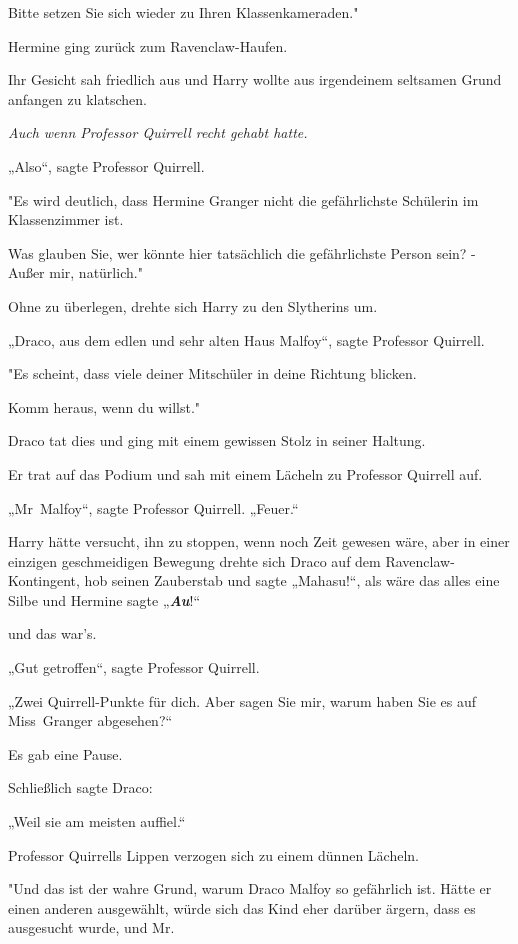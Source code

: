 {Bitte setzen Sie sich wieder zu Ihren Klassenkameraden."

Hermine ging zurück zum Ravenclaw-Haufen.

Ihr Gesicht sah friedlich aus und Harry wollte aus irgendeinem seltsamen Grund anfangen zu klatschen.

\emph{Auch wenn Professor Quirrell recht gehabt hatte.}

„Also“, sagte Professor Quirrell.

"Es wird deutlich, dass Hermine Granger nicht die gefährlichste Schülerin im Klassenzimmer ist.

Was glauben Sie, wer könnte hier tatsächlich die gefährlichste Person sein? - Außer mir, natürlich."

Ohne zu überlegen, drehte sich Harry zu den Slytherins um.

„Draco, aus dem edlen und sehr alten Haus Malfoy“, sagte Professor Quirrell.

"Es scheint, dass viele deiner Mitschüler in deine Richtung blicken.

Komm heraus, wenn du willst."

Draco tat dies und ging mit einem gewissen Stolz in seiner Haltung.

Er trat auf das Podium und sah mit einem Lächeln zu Professor Quirrell auf.

„Mr~Malfoy“, sagte Professor Quirrell. „Feuer.“

Harry hätte versucht, ihn zu stoppen, wenn noch Zeit gewesen wäre, aber in einer einzigen geschmeidigen Bewegung drehte sich Draco auf dem Ravenclaw-Kontingent, hob seinen Zauberstab und sagte „Mahasu!“, als wäre das alles eine Silbe und Hermine sagte „\textbf{\emph{Au}}!“

und das war's.

„Gut getroffen“, sagte Professor Quirrell.

„Zwei Quirrell-Punkte für dich. Aber sagen Sie mir, warum haben Sie es auf Miss~Granger abgesehen?“

Es gab eine Pause.

Schließlich sagte Draco:

„Weil sie am meisten auffiel.“

Professor Quirrells Lippen verzogen sich zu einem dünnen Lächeln.

"Und das ist der wahre Grund, warum Draco Malfoy so gefährlich ist. Hätte er einen anderen ausgewählt, würde sich das Kind eher darüber ärgern, dass es ausgesucht wurde, und Mr.

}
